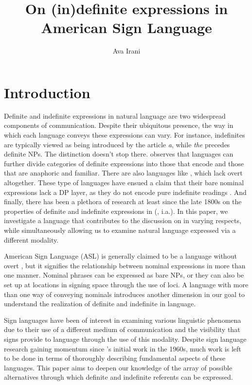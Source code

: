 \documentclass[output=paper,
modfonts
]{langscibook}
\title{On (in)definite expressions in American Sign Language}
\author{%
Ava Irani\affiliation{University of Pennsylvania}
}
\begin{document}
\maketitle
\section{Introduction} 

Definite and indefinite expressions in natural language are two widespread components of communication. Despite their ubiquitous presence, the way in which each language conveys these expressions can vary. For instance,  indefinites are typically viewed as being introduced by the article \textit{a}, while \textit{the} precedes definite NPs. The distinction doesn't stop there. \citet{Schwarz2009} observes that languages can further divide categories of definite expressions into those that encode  and those that are anaphoric and familiar. There are also languages like , which lack overt  altogether. These type of languages have ensued a claim that their bare nominal expressions lack a DP layer, as they do not encode pure indefinite readings \citep{Dayal2004}. And finally, there has been a plethora of research at least since the late 1800s on the properties of definite and indefinite expressions in  (\citealt{Frege1892, Russell1905, Kamp1981, Heim1982}, i.a.). In this paper, we investigate a language that contributes to the discussion on  in varying respects, while simultaneously allowing us to examine natural language expressed via a different modality. 

American Sign Language (ASL) is generally claimed to be a language without overt , but it signifies the relationship between nominal expressions in more than one manner. Nominal phrases can be expressed as bare NPs, or they can also be set up at locations in signing space through the use of loci. A language with more than one way of conveying nominals introduces another dimension in our goal to understand the realization of definite and indefinite  in language. 

Sign languages have been of interest in examining various linguistic phenomena due to their use of a different medium of communication and the visibility that signs provide to language through the use of this modality. Despite sign language research gaining momentum since \citeauthor{Stokoe1969}'s initial work in the 1960s, much work is left to be done in terms of thoroughly describing fundamental aspects of these languages. This paper aims to deepen our knowledge of the array of possible alternatives through which definite and indefinite referents can be expressed.
\end{document}
